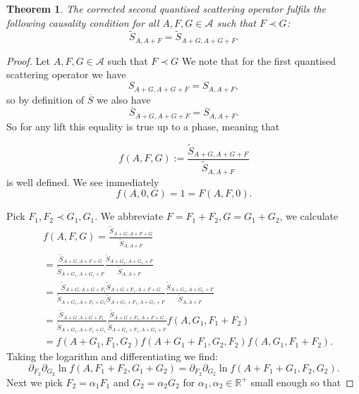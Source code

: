 \documentclass[a4paper,11pt]{article}
\newtheorem{thm}{Theorem}
\begin{document}
\begin{thm}
The corrected second quantised scattering operator fulfils the following causality condition for all \(A,F,G\in \mathcal{A}\) such that \(F\prec G\):
\begin{equation}
\tilde{S}_{A,A+F}=\tilde{S}_{A+G,A+G+F}.
\end{equation}
\end{thm}
\begin{proof}
Let \(A,F,G\in\mathcal{A}\) such that \(F\prec G\) We note that for the first quantised scattering operator we have
\begin{equation}
S_{A+G,A+G+F}=S_{A,A+F},
\end{equation}
so by definition of \(\overline{S}\) we also have
\begin{equation}\label{s bar causal}
\overline{S}_{A+G,A+G+F}=\overline{S}_{A,A+F}.
\end{equation}
So for any lift this equality is true up to a phase, meaning that 

\begin{equation}\label{f causal}
f(A,F,G):=\frac{\tilde{S}_{A+G,A+G+F}}{\tilde{S}_{A,A+F}}
\end{equation}
is well defined. We see immediately
\begin{equation}\label{vanish at axis}
f(A,0,G)=1=F(A,F,0).
\end{equation}

Pick \(F_1,F_2\prec G_1,G_1\). We abbreviate \(F=F_1+F_2, G=G_1+G_2\), we calculate
\begin{align}
&f(A,F,G)=\frac{\tilde{S}_{A+G,A+F+G}}{\tilde{S}_{A,A+F}}\\
&=\frac{\tilde{S}_{A+G,A+F+G}}{\tilde{S}_{A+G_1,A+G_1+F}}\frac{\tilde{S}_{A+G_1,A+G_1+F}}{\tilde{S}_{A,A+F}}\\
&=\frac{\tilde{S}_{A+G,A+G+F_1} \tilde{S}_{A+G+F_1,A+F+G}}{\tilde{S}_{ A+G_1,A+F_1+G_1} \tilde{S}_{ A+G_1+F_1,A+G_1+F}}  \frac{\tilde{S}_{A+G_1,A+G_1+F}}{\tilde{S}_{A,A+F}}\\
&=\frac{\tilde{S}_{A+G,A+G+F_1}}{\tilde{S}_{A+G_1,A+F_1+G_1}} \frac{\tilde{S}_{A+G+F_1,A+F+G}}{\tilde{S}_{A+G_1+F_1,A+G_1+F}}   f(A,G_1,F_1+F_2)\\
&=f(A+G_1,F_1,G_2)f(A+G_1+F_1,G_2,F_2)f(A,G_1,F_1+F_2).
\end{align}
Taking the logarithm and differentiating we find:
\begin{equation}\label{shift to small G,F}
\partial_{F_2}\partial_{G_2}\ln f(A,F_1+F_2,G_1+G_2)=\partial_{F_2}\partial_{G_2}\ln f(A+F_1+G_1,F_2,G_2).
\end{equation}
Next we pick \(F_2=\alpha_1 F_1\) and \(G_2=\alpha_2 G_2\) for \(\alpha_1,\alpha_2\in\mathbb{R}^+\) small enough so that


\end{proof}
\end{document}
